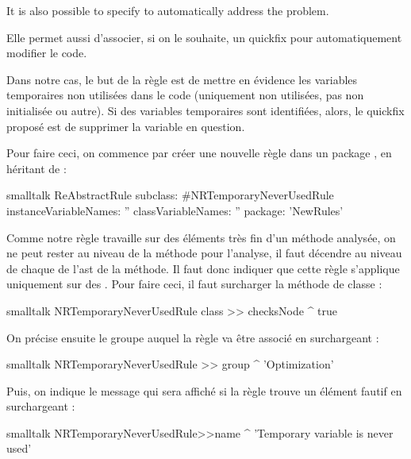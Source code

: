 \documentclass[10pt,twoside,english]{_support/latex/sbabook/sbabook}
\begin{document}
It is also possible to specify to automatically address the problem.

Elle permet aussi d'associer, si on le souhaite, un quickfix
pour automatiquement modifier le code.

Dans notre cas, le but de la r\`{e}gle est de mettre en \'{e}vidence les variables
temporaires non utilis\'{e}es dans le code (uniquement non utilis\'{e}es, pas non
initialis\'{e}e ou autre). Si des variables temporaires sont identifi\'{e}es, alors, le
quickfix propos\'{e} est de supprimer la variable en question.

Pour faire ceci, on commence par cr\'{e}er une nouvelle r\`{e}gle dans un package , en h\'{e}ritant de :
\begin{displaycode}{smalltalk}
ReAbstractRule subclass: #NRTemporaryNeverUsedRule
	instanceVariableNames: ''
	classVariableNames: ''
	package: 'NewRules'
\end{displaycode}

Comme notre r\`{e}gle travaille sur des \'{e}l\'{e}ments tr\`{e}s fin d'un m\'{e}thode analys\'{e}e, on ne peut rester au niveau de la m\'{e}thode pour l'analyse, il faut d\'{e}cendre au niveau de chaque  de l'ast de la m\'{e}thode. Il faut donc indiquer que cette r\`{e}gle s'applique uniquement sur des . Pour faire ceci, il faut surcharger la m\'{e}thode de classe :
\begin{displaycode}{smalltalk}
NRTemporaryNeverUsedRule class >> checksNode
	^ true
\end{displaycode}

On pr\'{e}cise ensuite le groupe auquel la r\`{e}gle va \^{e}tre associ\'{e} en surchargeant :
\begin{displaycode}{smalltalk}
NRTemporaryNeverUsedRule >> group
	^ 'Optimization'
\end{displaycode}

Puis, on indique le message qui sera affich\'{e} si la r\`{e}gle trouve un \'{e}l\'{e}ment
fautif en surchargeant :
\begin{displaycode}{smalltalk}
NRTemporaryNeverUsedRule>>name
	^ 'Temporary variable is never used'
\end{displaycode}
\end{document}
